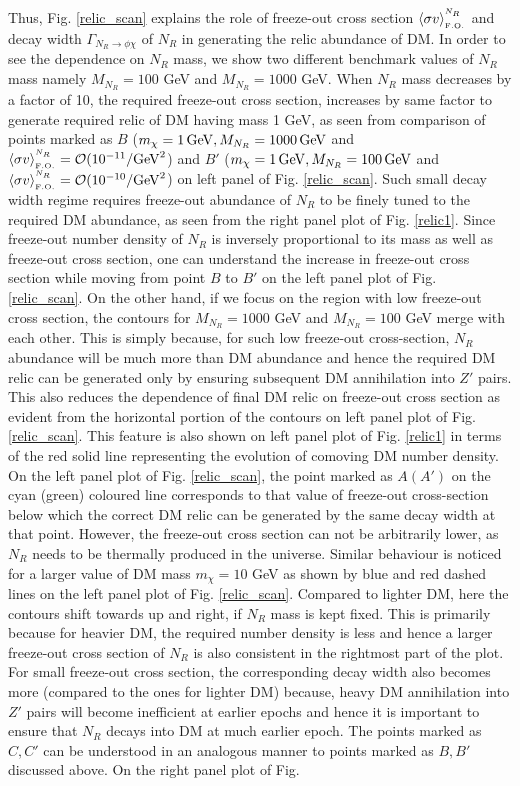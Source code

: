 \documentclass[prd,nofootinbib,preprint,superscriptaddress]{revtex4}
\begin{document}
Thus, Fig. \ref{relic_scan} explains the role of freeze-out cross section $\langle\sigma v \rangle^{^{N_R}}_{_{ \rm F.O.}}$ and decay width $\Gamma_{N_R \to \phi \chi}$ of $N_R$ in generating the relic abundance of DM. In order to see the dependence on $N_R$ mass, we show two different benchmark values of $N_R$ mass namely $M_{N_R} =100$ GeV and $M_{N_R} =1000$ GeV. When $N_R$ mass decreases by a factor of 10, the required freeze-out cross section, increases by same factor to generate required relic of DM having mass 1 GeV, as seen from comparison of points marked as $B$ ($m_\chi = 1 \,{\rm GeV},
M_{N_R} = 1000 \,{\rm GeV}$ and $\langle\sigma v \rangle^{^{N_R}}_{_{ \rm F.O.}}= {\cal O}(10^{-11}/{\rm GeV}^2$) 
and $B'$ ($m_\chi = 1 \,{\rm GeV}, M_{N_R} = 100 \,{\rm GeV}$ and $\langle\sigma v \rangle^{^{N_R}}_{_{ \rm F.O.}}= {\cal O}(10^{-10}/{\rm GeV}^2$) on left panel of Fig. \ref{relic_scan}. Such small decay width regime requires freeze-out abundance of $N_R$ to be finely tuned to the required DM abundance, as seen from the right panel plot of Fig. \ref{relic1}. Since freeze-out number density of $N_R$ is inversely proportional to its mass as well as freeze-out cross section, one can understand the increase in freeze-out cross section while moving from point $B$ to $B'$ on the left panel plot of Fig. \ref{relic_scan}. On the other hand, if we focus on the region with low freeze-out cross section, the contours for $M_{N_R}=1000$ GeV and $M_{N_R}=100$ GeV merge with each other. This is simply because, for such low freeze-out cross-section, $N_R$ abundance will be much more than DM abundance and hence the required DM relic can be generated only by ensuring subsequent DM annihilation into $Z'$ pairs. This also reduces the dependence of final DM relic on freeze-out cross section as evident from the horizontal portion of the contours on left panel plot of Fig. \ref{relic_scan}. This feature is also shown on left panel plot of Fig. \ref{relic1} in terms of the red solid line representing the evolution of comoving DM number density. On the left panel plot of Fig. \ref{relic_scan}, the point marked as $A (A')$ on the cyan (green) coloured line corresponds to that value of freeze-out cross-section below which the correct DM relic can be generated by the same decay width at that point. However, the freeze-out cross section can not be arbitrarily lower, as $N_R$ needs to be thermally produced in the universe. Similar behaviour is noticed for a larger value of DM mass $m_{\chi}=10$ GeV as shown by blue and red dashed lines on the left panel plot of Fig. \ref{relic_scan}. Compared to lighter DM, here the contours shift towards up and right, if $N_R$ mass is kept fixed. This is primarily because for heavier DM, the required number density is less and hence a larger freeze-out cross section of $N_R$ is also consistent in the rightmost part of the plot. For small freeze-out cross section, the corresponding decay width also becomes more (compared to the ones for lighter DM) because, heavy DM annihilation into $Z'$ pairs will become inefficient at earlier epochs and hence it is important to ensure that $N_R$ decays into DM at much earlier epoch. The points marked as $C, C'$ can be understood in an analogous manner to points marked as $B, B'$ discussed above. On the right panel plot of Fig. 
\end{document}
